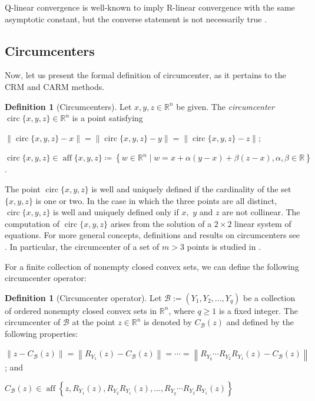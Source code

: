 \documentclass[smallextended,numbook,nospthms]{svjour3}
\theoremstyle{plain}
\theoremstyle{definition}
\newtheorem{definition}[theorem]{Definition}
\def\RR{\mathds R}
\DeclareMathOperator{\circum}{circ}
\begin{document}
Q-linear convergence is well-known to imply R-linear convergence with the same asymptotic constant, but the converse statement is not necessarily true \cite{Ortega:2000vd}.

\subsection{Circumcenters}
Now, let us present the formal definition of circumcenter, as it pertains to the CRM and CARM methods.
\begin{definition}[Circumcenters]\label{def:circum}
Let $x, y, z \in \RR^{n}$ be given. The \emph{circumcenter} $\circum\{x, y, z\} \in \RR^{n}$ is a point satisfying
\begin{listi}
\item  $\|\circum\{x, y, z\}-x\|=\|\circum\{x, y, z\}-y\|=\|\circum\{x, y, z\}-z\|$;
\item  $\circum\{x, y, z\} \in \operatorname{aff}\{x, y, z\}\coloneqq \left\{w \in \RR^{n} \mid w=x+\alpha(y-x)+\beta(z-x), \alpha, \beta \in \RR\right\}$.
\end{listi}
\end{definition}

The point $\circum\{x, y, z\}$ is well and uniquely defined if the cardinality of the set $\{x, y, z\}$ is one or two. In the case in which the three points are all distinct, $\circum\{x, y, z\}$ is well and uniquely defined only if $x,$ $y$ and $z$ are not collinear. The computation of $\circum\{x, y, z\}$ arises from the solution of a $2\times 2$  linear system of equations. 
For more general concepts, definitions and results on circumcenters see \cite{Behling:2020,Behling:2018a,Behling:2018,Bauschke:2018ut}. In particular, the circumcenter of a set of $m > 3$ points is studied in \cite{Behling:2018a,Bauschke:2019uh}.

For a finite collection of nonempty closed convex sets, we can define the following circumcenter operator:
\begin{definition}[Circumcenter operator]\label{def:circum oper}
Let $\mathcal{B}:=\left(Y_{1}, Y_{2}, \ldots, Y_{q}\right)$ be a collection of ordered nonempty closed convex sets in $\RR^{n}$, where $q \geq 1$ is a fixed integer. The circumcenter of $\mathcal{B}$ at the point $z \in \RR^{n}$ is denoted by $C_{\mathcal{B}}(z)$ and defined by the following properties:
\begin{listi}
	\item $\left\|z-C_{\mathcal{B}}(z)\right\|=\left\|R_{Y_{1}}(z)-C_{\mathcal{B}}(z)\right\|=\cdots=\left\|R_{Y_{q}} \cdots R_{Y_{2}} R_{Y_{1}}(z)-C_{\mathcal{B}}(z)\right\|$; and
	\item $C_{\mathcal{B}}(z) \in \operatorname{aff}\left\{z, R_{Y_{1}}(z), R_{Y_{2}} R_{Y_{1}}(z), \ldots, R_{Y_{q}} \cdots R_{Y_{2}} R_{Y_{1}}(z)\right\}$
\end{listi}
\end{definition}
\end{document}
